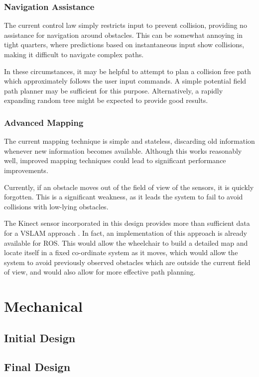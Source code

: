 \documentclass[oneside,final,a4paper]{report}
\begin{document}
\subsection{Navigation Assistance}
The current control law simply restricts input to prevent collision, providing no assistance for navigation around obstacles.  This can be somewhat annoying in tight quarters, where predictions based on instantaneous input show collisions, making it difficult to navigate complex paths.  

In these circumstances, it may be helpful to attempt to plan a collision free path which approximately follows the user input commands.  A simple potential field path planner may be sufficient for this purpose.  Alternatively, a rapidly expanding random tree might be expected to provide good results.   

\subsection{Advanced Mapping}
The current mapping technique is simple and stateless, discarding old information whenever new information becomes available.  Although this works reasonably well, improved mapping techniques could lead to significant performance improvements.  

Currently, if an obstacle moves out of the field of view of the sensors, it is quickly forgotten.  This is a significant weakness, as it leads the system to fail to avoid collisions with low-lying obstacles.

The Kinect sensor incorporated in this design provides more than sufficient data for a VSLAM approach \cite{kinect_vslam}.  In fact, an implementation of this approach is already available for ROS.  This would allow the wheelchair to build a detailed map and locate itself in a fixed co-ordinate system as it moves, which would allow the system to avoid previously observed obstacles which are outside the current field of view, and would also allow for more effective path planning.

\chapter{Mechanical}

\section{Initial Design}

\section{Final Design}
\end{document}
